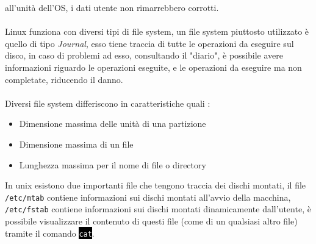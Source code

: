 \documentclass[12pt, letterpaper]{article}
\newcommand{\code}[1]{\colorbox{light-gray}{\texttt{#1}}}
\newcommand{\shelll}[1]{\colorbox{black}{\textcolor{white}{\texttt{#1}}}}
\newcommand{\acc}{\\\hphantom{}\\}
\begin{document}
 all'unità dell'OS, i dati utente non rimarrebbero corrotti. \acc 
 Linux funziona con diversi tipi di file system, un file system piuttosto utilizzato è quello di tipo \textit{Journal}, esso 
 tiene traccia di tutte le operazioni da eseguire sul disco, in caso di problemi ad esso, consultando il "diario", è possibile 
 avere informazioni riguardo le operazioni eseguite, e le operazioni da eseguire ma non completate, riducendo il danno.\acc 
 Diversi file system differiscono in caratteristiche quali : \begin{itemize}
    \item Dimensione massima delle unità di una partizione 
    \item Dimensione massima di un file
    \item Lunghezza massima per il nome di file o directory
 \end{itemize}
 In unix esistono due importanti file che tengono traccia dei dischi montati, il file \code{/etc/mtab} contiene informazioni 
 sui dischi montati all'avvio della macchina, \code{/etc/fstab} contiene informazioni sui dischi montati dinamicamente dall'utente, è 
 possibile visualizzare il contenuto di questi file (come di un qualsiasi altro file) tramite il comando \shelll{cat}.
\end{document}
